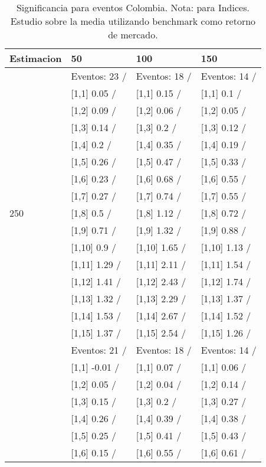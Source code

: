 \begin{table}

\caption{Significancia para eventos Colombia. Nota: para Indices. Estudio sobre la media utilizando benchmark como retorno de mercado.}
\centering
\begin{tabular}[t]{llll}
\toprule
Estimacion & 50 & 100 & 150\\
\midrule
 & Eventos:  23 / & Eventos:  18 / & Eventos:  14 /\\
 & {}[1,1] 0.05  / & {}[1,1] 0.15  / & {}[1,1] 0.1  /\\
 & {}[1,2] 0.09  / & {}[1,2] 0.06  / & {}[1,2] 0.05  /\\
 & {}[1,3] 0.14  / & {}[1,3] 0.2  / & {}[1,3] 0.12  /\\
 & {}[1,4] 0.2  / & {}[1,4] 0.35  / & {}[1,4] 0.19  /\\
\addlinespace
 & {}[1,5] 0.26  / & {}[1,5] 0.47  / & {}[1,5] 0.33  /\\
 & {}[1,6] 0.23  / & {}[1,6] 0.68  / & {}[1,6] 0.55  /\\
 & {}[1,7] 0.27  / & {}[1,7] 0.74  / & {}[1,7] 0.55  /\\
250 & {}[1,8] 0.5  / & {}[1,8] 1.12  / & {}[1,8] 0.72  /\\
 & {}[1,9] 0.71  / & {}[1,9] 1.32  / & {}[1,9] 0.88  /\\
\addlinespace
 & {}[1,10] 0.9  / & {}[1,10] 1.65  / & {}[1,10] 1.13  /\\
 & {}[1,11] 1.29  / & {}[1,11] 2.11  / & {}[1,11] 1.54  /\\
 & {}[1,12] 1.41  / & {}[1,12] 2.43  / & {}[1,12] 1.74  /\\
 & {}[1,13] 1.32  / & {}[1,13] 2.29  / & {}[1,13] 1.37  /\\
 & {}[1,14] 1.53  / & {}[1,14] 2.67  / & {}[1,14] 1.52  /\\
\addlinespace
 & {}[1,15] 1.37  / & {}[1,15] 2.54  / & {}[1,15] 1.26  /\\
 & Eventos:  21 / & Eventos:  18 / & Eventos:  14 /\\
 & {}[1,1] -0.01  / & {}[1,1] 0.07  / & {}[1,1] 0.06  /\\
 & {}[1,2] 0.05  / & {}[1,2] 0.04  / & {}[1,2] 0.14  /\\
 & {}[1,3] 0.15  / & {}[1,3] 0.2  / & {}[1,3] 0.27  /\\
\addlinespace
 & {}[1,4] 0.26  / & {}[1,4] 0.39  / & {}[1,4] 0.38  /\\
 & {}[1,5] 0.25  / & {}[1,5] 0.41  / & {}[1,5] 0.43  /\\
 & {}[1,6] 0.15  / & {}[1,6] 0.55  / & {}[1,6] 0.61  /\\

\end{tabular}
\end{table}
